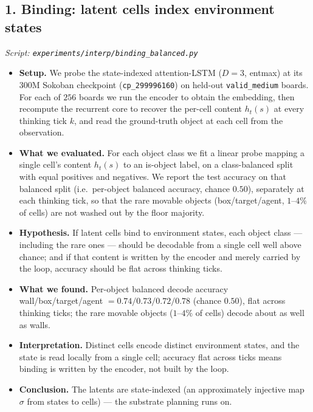 \documentclass[11pt]{article}
\begin{document}
\subsection*{1. Binding: latent cells index environment states}
\textit{Script: \texttt{experiments/interp/binding\_balanced.py}}
\begin{itemize}
\item \textbf{Setup.} We probe the state-indexed attention-LSTM ($D=3$, entmax) at its $300$M Sokoban checkpoint (\texttt{cp\_299996160}) on held-out \texttt{valid\_medium} boards. For each of $256$ boards we run the encoder to obtain the embedding, then recompute the recurrent core to recover the per-cell content $h_t(s)$ at every thinking tick $k$, and read the ground-truth object at each cell from the observation.
\item \textbf{What we evaluated.} For each object class we fit a linear probe mapping a single cell's content $h_t(s)$ to an is-object label, on a class-balanced split with equal positives and negatives. We report the test accuracy on that balanced split (i.e.\ per-object balanced accuracy, chance $0.50$), separately at each thinking tick, so that the rare movable objects (box/target/agent, $1$--$4\%$ of cells) are not washed out by the floor majority.
\item \textbf{Hypothesis.} If latent cells bind to environment states, each object class --- including the rare ones --- should be decodable from a single cell well above chance; and if that content is written by the encoder and merely carried by the loop, accuracy should be flat across thinking ticks.
\item \textbf{What we found.} Per-object balanced decode accuracy wall/box/target/agent $=0.74/0.73/0.72/0.78$ (chance $0.50$), flat across thinking ticks; the rare movable objects ($1$--$4\%$ of cells) decode about as well as walls.
\item \textbf{Interpretation.} Distinct cells encode distinct environment states, and the state is read locally from a single cell; accuracy flat across ticks means binding is written by the encoder, not built by the loop.
\item \textbf{Conclusion.} The latents are state-indexed (an approximately injective map $\sigma$ from states to cells) --- the substrate planning runs on.
\end{itemize}
\clearpage
\end{document}
